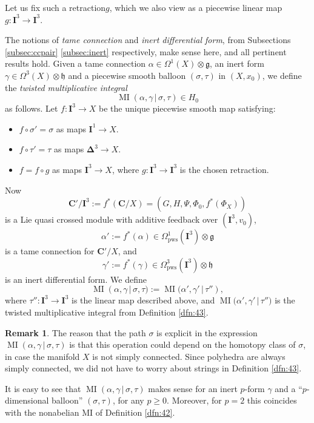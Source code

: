 \documentclass[10pt, a4paper]{amsart}
\theoremstyle{definition}
\newtheorem{rem}[equation]{Remark}
\numberwithin{equation}{section}
\newcommand{\opn}{\operatorname}
\newcommand{\mfrak}[1]{\mathfrak{#1}}
\newcommand{\mbf}[1]{\mathbf{#1}}
\newcommand{\mrm}[1]{\mathrm{#1}}
\newcommand{\bsym}[1]{\boldsymbol{#1}}
\renewcommand{\vert}{\, | \,}
\newcommand{\g}{\mfrak{g}}
\newcommand{\h}{\mfrak{h}}
\newcommand{\lb}{\linebreak}
\begin{document}
Let us fix such a retraction$g$, which we also view as a piecewise linear map
$g : \mbf{I}^3 \to \mbf{I}^3$.

The notions of {\em tame connection} and 
{\em inert differential form}, from Subsections \ref{subsec:ccpair}
\ref{subsec:inert} respectively, make sense here, and all pertinent results
hold. Given a tame connection 
$\alpha \in \Omega^1(X) \otimes \g$, 
an inert form $\gamma \in \Omega^3(X) \otimes \h$
and  a piecewise smooth balloon $(\sigma, \tau)$ in $(X, x_0)$, we define the
{\em twisted
multiplicative integral}
\[ \opn{MI}(\alpha, \gamma \vert \sigma, \tau) \in H_0  \] 
as follows. Let $f : \mbf{I}^3 \to X$ be the unique piecewise smooth map
satisfying:
\begin{itemize}
\item $f \circ \sigma'  = \sigma$ as maps
$\mbf{I}^1 \to X$.
\item $f \circ \tau'  = \tau$ as maps
$\bsym{\Delta}^3 \to X$.
\item $f = f \circ g$ as maps $\mbf{I}^3 \to X$, where 
$g: \mbf{I}^3 \to \mbf{I}^3$ is the chosen retraction.
\end{itemize}
Now 
\[ \mbf{C}' / \mbf{I}^3 := f^*(\mbf{C} / X) = (G, H, \Psi, \Phi_0, f^*(\Phi_X))
\]
is a Lie quasi crossed module with additive feedback
over $(\mbf{I}^3, v_0)$,
\[ \alpha' := f^*(\alpha) \in \Omega^1_{\mrm{pws}}(\mbf{I}^3) \otimes \g \]
is a tame connection for $\mbf{C}' / X$, and 
\[ \gamma' := f^*(\gamma) \in \Omega^3_{\mrm{pws}}(\mbf{I}^3) \otimes \h \]
is an inert differential form. We define
\begin{equation} \label{eqn:161}
\opn{MI}(\alpha, \gamma \vert \sigma, \tau) :=
\opn{MI} \bigl( \alpha', \gamma' \vert \tau'') ,
\end{equation}
where $\tau'' : \mbf{I}^3 \to \mbf{I}^3$ is the linear map described above,
and 
$\opn{MI} \bigl( \alpha', \gamma' \vert \tau'')$
is the twisted multiplicative integral from Definition \ref{dfn:43}.

\begin{rem}
The reason that the path $\sigma$ is explicit in the expression \lb
$\opn{MI}(\alpha, \gamma \vert \sigma, \tau)$ 
is that this operation could depend on the homotopy class of $\sigma$, in case
the manifold $X$ is not simply connected. Since polyhedra are always simply
connected, we did not have to worry about strings in Definition \ref{dfn:43}.

It is easy to see that $\opn{MI}(\alpha, \gamma \vert \sigma, \tau)$ 
makes sense for an inert $p$-form $\gamma$ and a ``$p$-dimensional balloon''
$(\sigma, \tau)$, for any $p \geq 0$. Moreover, for $p = 2$ this coincides with
the nonabelian MI of Definition \ref{dfn:42}.
\end{rem}
\end{document}
